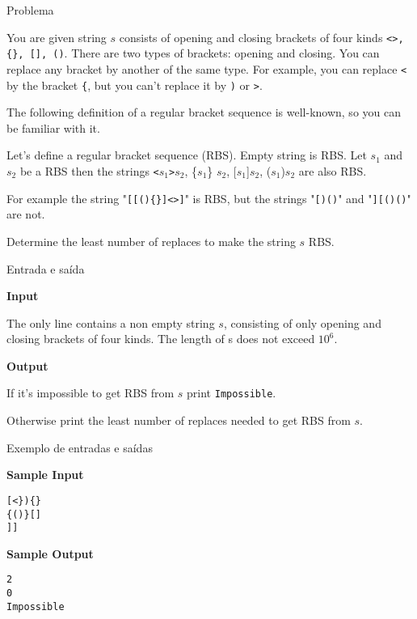 
\begin{frame}[fragile]{Problema}

You are given string $s$ consists of opening and closing brackets of four kinds \texttt{<>, \{\}, [], ()}. There are two types of brackets: opening and closing. You can replace any bracket by another of the same type. For example, you can replace \texttt{<} by the bracket \texttt{\{}, but you can't replace it by \texttt{)} or \texttt{>}.

The following definition of a regular bracket sequence is well-known, so you can be familiar with it.

Let's define a regular bracket sequence (RBS). Empty string is RBS. Let $s_1$ and $s_2$ be a RBS then the strings \texttt{<}$s_1$\texttt{>}$s_2$, \{$s_1$\} $s_2$, [$s_1$]$s_2$, ($s_1$)$s_2$ are also RBS.

For example the string "\texttt{[[()\{\}]<>]}" is RBS, but the strings "\texttt{[)()}" and "\texttt{][()()}" are not.

Determine the least number of replaces to make the string $s$ RBS.

\end{frame}

\begin{frame}[fragile]{Entrada e saída}

\textbf{Input}

The only line contains a non empty string $s$, consisting of only opening and closing brackets of four kinds. The length of s does not exceed $10^6$.

\textbf{Output}

If it's impossible to get RBS from $s$ print \texttt{Impossible}.

Otherwise print the least number of replaces needed to get RBS from $s$.

\end{frame}

\begin{frame}[fragile]{Exemplo de entradas e saídas}

\begin{minipage}[t]{0.5\textwidth}
\textbf{Sample Input}
\begin{verbatim}
[<}){}
{()}[]
]]
\end{verbatim}
\end{minipage}
\begin{minipage}[t]{0.45\textwidth}
\textbf{Sample Output}
\begin{verbatim}
2
0
Impossible
\end{verbatim}
\end{minipage}
\end{frame}

